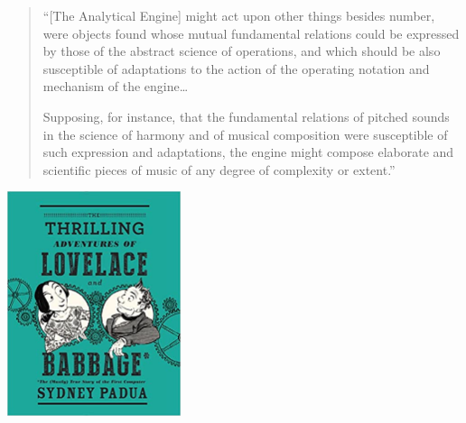 \documentclass[xcolor={usenames,dvipsnames,svgnames,table},12pt]{beamer}
\begin{document}
\begin{frame}{}
  \begin{quote}
    ``[The Analytical Engine] might act upon other things besides number,
    were objects found whose mutual fundamental relations could be
    expressed by those of the abstract science of operations, and which
    should be also susceptible of adaptations to the action of the
    operating notation and mechanism of the engine\dots \medskip

    Supposing, for instance, that the fundamental relations of pitched
    sounds in the science of harmony and of musical composition were
    susceptible of such expression and adaptations, the engine might
    compose elaborate and scientific pieces of music of any degree of
    complexity or extent.''
  \end{quote}
\end{frame}

\begin{frame}{}
  \begin{center}
    \includegraphics[width=2in]{adventures}
  \end{center}
\end{frame}
\end{document}
